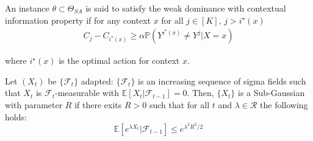 
\begin{defi} An instance $\theta \subset \Theta_{SA}$ is said to satisfy the weak dominance with contextual information property if for any context $x$ 	for all $ j \in [K], \, j > i^\star(x) $
	\begin{align} \label{equ:WDC}
C_j - C_{i^\star(x)} \geq \alpha\mathbb{P}(Y^{i^\star(x)} \neq Y^j|X=x)
	\end{align}
\end{defi} 
where $i^\star(x)$ is the optimal action for context $x$.

\begin{defi}
	Let $(X_t)$ be  $\{\mathcal{F}_t\}$ adapted: $\{\mathcal{F}_t\}$ is an increasing sequence of sigma fields such that $X_t$ is $\mathcal{F}_t$-measurable with $\mathbb{E}[X_t | \mathcal{F}_{t-1}] = 0$. Then, $\{X_t\}$ is a Sub-Gaussian with parameter $R$ if there exits $R>0$  such that for all $t$ and $\lambda \in \mathcal{R}$ the following holds:
	\begin{equation}
	\label{equ:sub_gaussian}
	\mathbb{E}\left[e^{\lambda X_t}| \mathcal{F}_{t-1}\right] \leq e^{\lambda^2R^2/2}
	\end{equation}
\end{defi} 


%	

